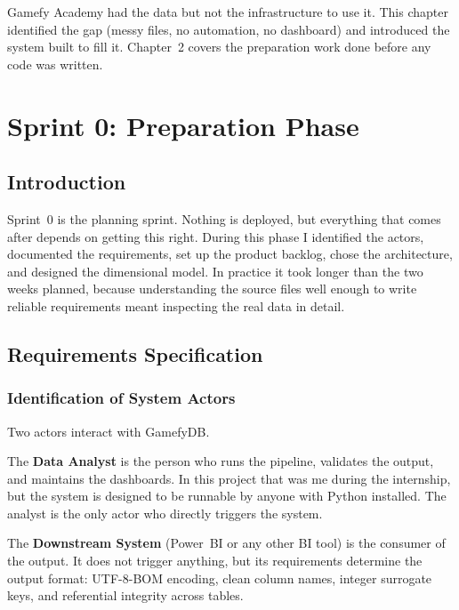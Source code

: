 \documentclass[12pt, a4paper]{report}
\begin{document}
Gamefy Academy had the data but not the infrastructure to use it. This chapter
identified the gap (messy files, no automation, no dashboard) and introduced
the system built to fill it. Chapter~2 covers the preparation work done before
any code was written.

\chapter{Sprint 0: Preparation Phase}

\section{Introduction}

Sprint~0 is the planning sprint. Nothing is deployed, but everything that comes
after depends on getting this right. During this phase I identified the actors,
documented the requirements, set up the product backlog, chose the architecture,
and designed the dimensional model. In practice it took longer than the two weeks
planned, because understanding the source files well enough to write reliable
requirements meant inspecting the real data in detail.

\section{Requirements Specification}

\subsection{Identification of System Actors}

Two actors interact with GamefyDB.

The \textbf{Data Analyst} is the person who runs the pipeline, validates the output,
and maintains the dashboards. In this project that was me during the internship, but
the system is designed to be runnable by anyone with Python installed. The analyst
is the only actor who directly triggers the system.

The \textbf{Downstream System} (Power~BI or any other BI tool) is the consumer of
the output. It does not trigger anything, but its requirements determine the output
format: UTF-8-BOM encoding, clean column names, integer surrogate keys, and
referential integrity across tables.
\end{document}
